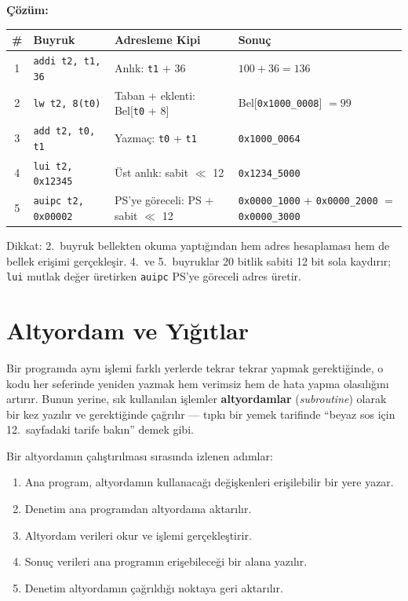 \begin{ornek}[3.20]
\textbf{Çözüm:}

\begin{center}
\small
\begin{tabular}{clp{3.8cm}l}
\toprule
\textbf{\#} & \textbf{Buyruk} & \textbf{Adresleme Kipi} & \textbf{Sonuç} \\
\midrule
1 & \texttt{addi t2, t1, 36} & Anlık: \texttt{t1} + 36 & $100 + 36 = 136$ \\
2 & \texttt{lw t2, 8(t0)} & Taban + eklenti: Bel[\texttt{t0} + 8] & Bel[\texttt{0x1000\_0008}] $= 99$ \\
3 & \texttt{add t2, t0, t1} & Yazmaç: \texttt{t0} + \texttt{t1} & \texttt{0x1000\_0064} \\
4 & \texttt{lui t2, 0x12345} & Üst anlık: sabit $\ll$ 12 & \texttt{0x1234\_5000} \\
5 & \texttt{auipc t2, 0x00002} & PS'ye göreceli: PS + sabit $\ll$ 12 & \texttt{0x0000\_1000} + \texttt{0x0000\_2000} $=$ \texttt{0x0000\_3000} \\
\bottomrule
\end{tabular}
\end{center}

Dikkat: 2.~buyruk bellekten okuma yaptığından hem adres hesaplaması hem de bellek erişimi gerçekleşir. 4.~ve 5.~buyruklar 20 bitlik sabiti 12 bit sola kaydırır; \texttt{lui} mutlak değer üretirken \texttt{auipc} PS'ye göreceli adres üretir.
\end{ornek}

\section{Altyordam ve Yığıtlar}
\label{sec:altyordam-yigitlar}

Bir programda aynı işlemi farklı yerlerde tekrar tekrar yapmak gerektiğinde, o kodu her seferinde yeniden yazmak hem verimsiz hem de hata yapma olasılığını artırır. Bunun yerine, sık kullanılan işlemler \textbf{altyordamlar} (\emph{subroutine}) olarak bir kez yazılır ve gerektiğinde çağrılır --- tıpkı bir yemek tarifinde ``beyaz sos için 12.~sayfadaki tarife bakın'' demek gibi.

Bir altyordamın çalıştırılması sırasında izlenen adımlar:
\begin{enumerate}
\item Ana program, altyordamın kullanacağı değişkenleri erişilebilir bir yere yazar.
\item Denetim ana programdan altyordama aktarılır.
\item Altyordam verileri okur ve işlemi gerçekleştirir.
\item Sonuç verileri ana programın erişebileceği bir alana yazılır.
\item Denetim altyordamın çağrıldığı noktaya geri aktarılır.
\end{enumerate}

